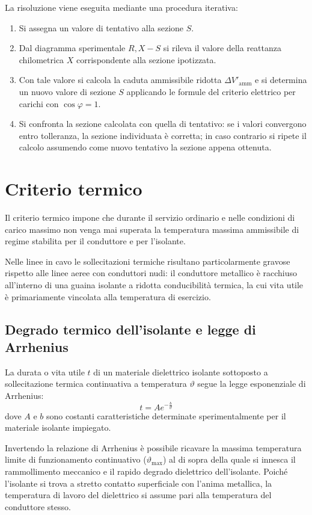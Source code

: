 La risoluzione viene eseguita mediante una procedura iterativa:
\begin{enumerate}
    \item Si assegna un valore di tentativo alla sezione $S$.
    \item Dal diagramma sperimentale $R, X - S$ si rileva il valore della reattanza chilometrica $X$ corrispondente alla sezione ipotizzata.
    \item Con tale valore si calcola la caduta ammissibile ridotta $\Delta V'_{\text{amm}}$ e si determina un nuovo valore di sezione $S$ applicando le formule del criterio elettrico per carichi con $\cos\varphi = 1$.
    \item Si confronta la sezione calcolata con quella di tentativo: se i valori convergono entro tolleranza, la sezione individuata è corretta; in caso contrario si ripete il calcolo assumendo come nuovo tentativo la sezione appena ottenuta.
\end{enumerate}

\section{Criterio termico}
Il criterio termico impone che durante il servizio ordinario e nelle condizioni di carico massimo non venga mai superata la temperatura massima ammissibile di regime stabilita per il conduttore e per l'isolante.

Nelle linee in cavo le sollecitazioni termiche risultano particolarmente gravose rispetto alle linee aeree con conduttori nudi: il conduttore metallico è racchiuso all'interno di una guaina isolante a ridotta conducibilità termica, la cui vita utile è primariamente vincolata alla temperatura di esercizio.

\subsection{Degrado termico dell'isolante e legge di Arrhenius}
La durata o vita utile $t$ di un materiale dielettrico isolante sottoposto a sollecitazione termica continuativa a temperatura $\vartheta$ segue la legge esponenziale di Arrhenius:
\[ t = A e^{-\frac{b}{\vartheta}} \]
dove $A$ e $b$ sono costanti caratteristiche determinate sperimentalmente per il materiale isolante impiegato.

Invertendo la relazione di Arrhenius è possibile ricavare la massima temperatura limite di funzionamento continuativo ($\vartheta_{\text{max}}$) al di sopra della quale si innesca il rammollimento meccanico e il rapido degrado dielettrico dell'isolante. Poiché l'isolante si trova a stretto contatto superficiale con l'anima metallica, la temperatura di\textbf{} lavoro del dielettrico si assume pari alla temperatura del conduttore stesso.

